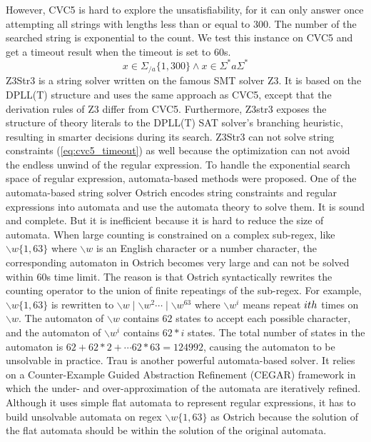 {However, CVC5 is hard to explore the unsatisfiability, for it can only answer once attempting all strings with lengths less than or equal to 300. The number of the searched string is exponential to the count. We test this instance on CVC5 and get a timeout result when the timeout is set to 60s.
\begin{equation} \label{eq:cvc5_timeout}
  x\in \Sigma_{/a}\{1,300\}\wedge x\in \Sigma^*a\Sigma^*
\end{equation}
Z3Str3\cite{z3str3} is a string solver written on the famous SMT solver Z3\cite{Z3}. It is based on the DPLL(T) structure and uses the same approach as CVC5, except that the derivation rules of Z3 differ from CVC5. Furthermore, Z3str3 exposes the structure of theory literals to the DPLL(T) SAT solver's branching heuristic, resulting in smarter decisions during its search. Z3Str3 can not solve string constraints (\ref{eq:cvc5_timeout}) as well because the optimization can not avoid the endless unwind of the regular expression. To handle the exponential search space of regular expression, automata-based methods were proposed. One of the automata-based string solver Ostrich\cite{ostrich}\cite{atva2020} encodes string constraints and regular expressions into automata and use the automata theory to solve them. It is sound and complete. But it is inefficient because it is hard to reduce the size of automata. When large counting is constrained on a complex sub-regex, like $ \backslash w \{1, 63\}$ where $\backslash w$ is an English character or a number character, the corresponding automaton in Ostrich becomes very large and can not be solved within 60s time limit. The reason is that Ostrich syntactically rewrites the counting operator to the union of finite repeatings of the sub-regex. For example, $\backslash w\{1, 63\}$ is rewritten to $\backslash w\mid\backslash w^2\cdots\mid\backslash w^{63}$ where $\backslash w^i$ means repeat $i\-th$ times on $\backslash w$. The automaton of $\backslash w$ contains $62$ states to accept each possible character, and the automaton of $\backslash w ^i$ contains $62*i$ states. The total number of states in the automaton is $62 + 62*2 + \cdots 62*63=124992$, causing the automaton to be unsolvable in practice. Trau\cite{z3trau}\cite{trau+} is another powerful automata-based solver. It relies on a Counter-Example Guided Abstraction Refinement (CEGAR) framework in which the under- and over-approximation of the automata are iteratively refined. Although it uses simple flat automata to represent regular expressions, it has to build unsolvable automata on regex $\backslash w\{1, 63\}$ as Ostrich because the solution of the flat automata should be within the solution of the original automata. 
}
